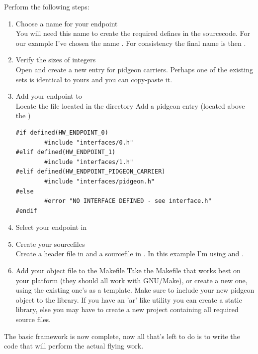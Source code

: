 Perform the following steps:
\begin{enumerate}

	\item Choose a name for your endpoint\\
	You will need this name to create the required defines in the sourcecode.
	For our example I've chosen the name .
	For consistency the final name is then .

	\item Verify the sizes of integers\\
	Open  and create a new entry for pidgeon carriers. Perhaps
	one of the existing sets is identical to yours and you can copy-paste it.

	\item Add your endpoint to \\
	Locate the file  located in the directory 
	Add a pidgeon entry (located above the )
\begin{lstlisting}
#if defined(HW_ENDPOINT_0)
   		#include "interfaces/0.h"
#elif defined(HW_ENDPOINT_1)
        #include "interfaces/1.h"
#elif defined(HW_ENDPOINT_PIDGEON_CARRIER)
        #include "interfaces/pidgeon.h"
#else
        #error "NO INTERFACE DEFINED - see interface.h"
#endif
\end{lstlisting}

	\item Select your endpoint in 
	
	\item Create your sourcefiles\\
	Create a header file in  and a sourcefile in .
	In this example I'm using  and .

	\item Add your object file to the Makefile
	Take the Makefile that works best on your platform (they should all work with
	GNU/Make), or create a new one, using the existing one's as a template.
	Make sure to include your new pidgeon object to the library.
	If you have an 'ar' like utility you can create a static library, else you may
	have to create a new project containing all required source files.

\end{enumerate}

The basic framework is now complete, now all that's left to do is to write the code
that will perform the actual flying work.

